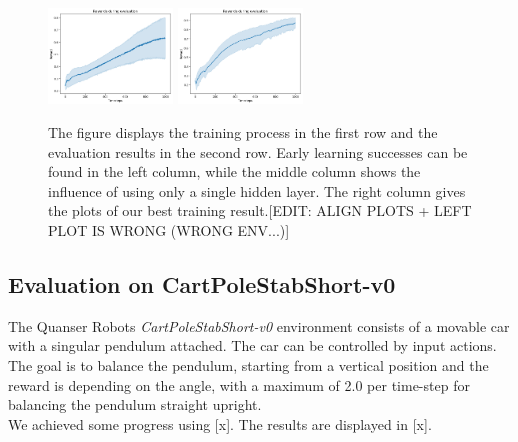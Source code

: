 \begin{figure}
	\includegraphics[width=0.295\textwidth]{plots/DDPGballbalancer24-2-16.png}
	\includegraphics[width=0.295\textwidth]{plots/DDPGballbalancer26-2-20.png}

	\caption{The figure displays the training process in the first row and the evaluation results in the second row. Early learning successes can be found in the left column, while the middle column shows the influence of using only a single hidden layer. The right column gives the plots of our best training result.[EDIT: ALIGN PLOTS + LEFT PLOT IS WRONG (WRONG ENV...)]}
	\label{ddpg:ball}
\end{figure}
\subsection{Evaluation on CartPoleStabShort-v0}
The Quanser Robots \textit{CartPoleStabShort-v0} environment consists of a movable car with a singular pendulum attached. The car can be controlled by input actions. The goal is to balance the pendulum, starting from a vertical position and the reward is depending on the angle, with a maximum of 2.0 per time-step for balancing the pendulum straight upright.\\
We achieved some progress using [x]. The results are displayed in [x].
